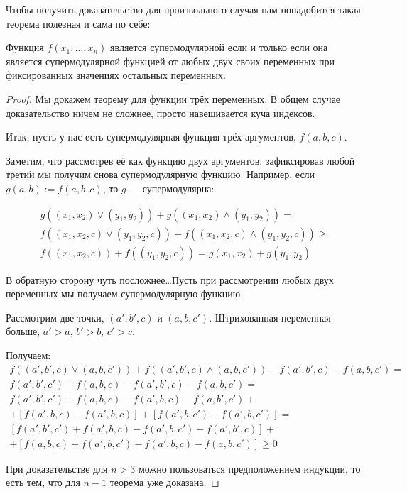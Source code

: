 Чтобы получить доказательство для произвольного случая нам понадобится такая теорема полезная и сама по себе:
\begin{myth}
Функция $ f(x_{1},\ldots,x_{n}) $ является супермодулярной если и только если она является супермодулярной функцией от любых двух своих переменных при фиксированных значениях остальных переменных.
\end{myth}

\begin{proof}

Мы докажем теорему для функции трёх переменных. В общем случае доказательство ничем не сложнее, просто навешивается куча индексов.

Итак, пусть у нас есть супермодулярная функция трёх аргументов, $ f(a,b,c) $.

Заметим, что рассмотрев её как функцию двух аргументов, зафиксировав любой третий мы получим снова супермодулярную функцию. Например, если $ g(a,b):=f(a,b,c) $, то $ g $ — супермодулярна:

\begin{multline}
g((x_{1},x_{2})\vee (y_{1},y_{2}))+g((x_{1},x_{2})\wedge (y_{1},y_{2}))=\\
f((x_{1},x_{2},c)\vee (y_{1},y_{2},c))+f((x_{1},x_{2},c)\wedge (y_{1},y_{2},c))\geq \\
f((x_{1},x_{2},c))+f((y_{1},y_{2},c))=g(x_{1},x_{2})+g(y_{1},y_{2})
\end{multline}

В обратную сторону чуть посложнее\ldots Пусть при рассмотрении любых двух переменных мы получаем супермодулярную функцию.

Рассмотрим две точки, $(a',b',c) $ и $ (a,b,c') $. Штрихованная переменная больше, $ a'>a $, $ b'>b $, $ c'>c $.

Получаем:
\begin{multline}
f((a',b',c)\vee (a,b,c'))+f((a',b',c)\wedge (a,b,c'))-f(a',b',c)-f(a,b,c')=\\
f(a',b',c')+f(a,b,c)-f(a',b',c)-f(a,b,c')=\\
f(a',b',c')+f(a,b,c)-f(a',b,c)-f(a,b',c')+\\
+[f(a',b,c)-f(a',b,c)]+[f(a',b,c')-f(a',b,c')]=\\
[f(a',b',c')+f(a',b,c)-f(a',b,c')-f(a',b',c)]+\\
+[f(a,b,c)+f(a',b,c')-f(a',b,c)-f(a,b,c')]\geq 0
\end{multline}

При доказательстве для $ n>3 $ можно пользоваться предположением индукции, то есть тем, что для $ n-1 $ теорема уже доказана.
\end{proof}


